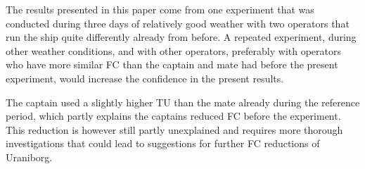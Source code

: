 The results presented in this paper come from one experiment that was conducted during three days of relatively good weather with two operators that run the ship quite differently already from before.
A repeated experiment, during other weather conditions, and with other operators, preferably with operators who have more similar FC than the captain and mate had before the present experiment, would increase the confidence in the present results.

The captain used a slightly higher TU than the mate already during the reference period, which partly explains the captains reduced FC before the experiment. %
This reduction is however still partly unexplained and requires more thorough investigations that could lead to suggestions for further FC reductions of Uraniborg.